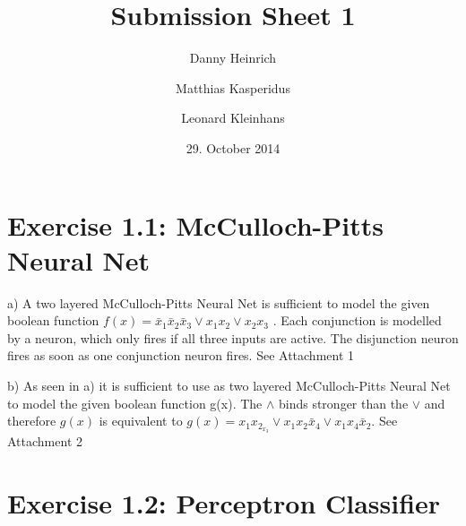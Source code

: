 \documentclass{scrartcl}
\title{Submission Sheet 1}
\author{Danny Heinrich \and Matthias Kasperidus \and Leonard Kleinhans}
\date{29. October 2014}
\begin{document}
\maketitle

\section{Exercise 1.1: McCulloch-Pitts Neural Net}
\item a) A two layered McCulloch-Pitts Neural Net is sufficient to model the given boolean function $f(x) = \bar x_1 \bar x_2 \bar x_3 \vee  x_1 x_2 \vee x_2 x_3 $ . Each conjunction is modelled by a neuron, which only fires if all three
inputs are active. The disjunction neuron fires as soon as one conjunction neuron fires. See Attachment 1

\item b) As seen in a) it is sufficient to use as two layered McCulloch-Pitts Neural Net to model the given boolean function g(x). 
The $\wedge$ binds stronger than the $\vee$ and therefore $g(x)$ is equivalent to $g(x) = x_1 x_2_x_3 \vee  x_1 x_2 \bar x_4\vee x_1 x_4 \bar x_2 $. See Attachment 2

\section{Exercise 1.2: Perceptron Classifier}
\end{document}
